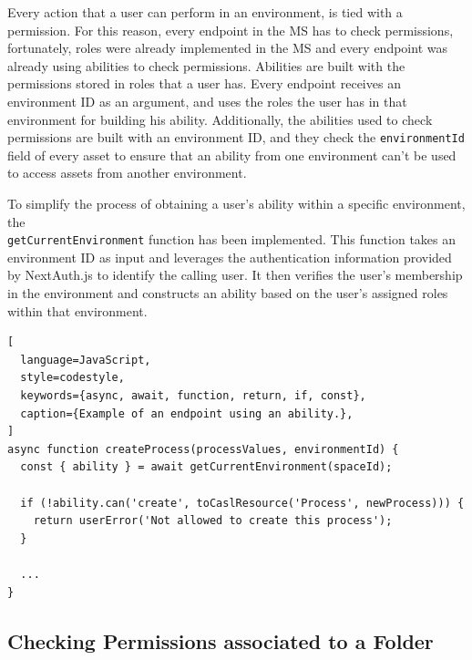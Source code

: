 Every action that a user can perform in an environment, is tied with a permission.
For this reason, every endpoint in the MS has to check permissions, fortunately, roles
were already implemented in the MS and every endpoint was already using abilities to check permissions.
Abilities are built with the permissions stored in roles that a user has.
Every endpoint receives an environment ID as an argument,
and uses the roles the user has in that environment for building his ability.
Additionally, the abilities used to check permissions are built with an environment ID,
and they check the \lstinline{environmentId} field of every asset to ensure that an
ability from one environment can't be used to access assets from another environment.

To simplify the process of obtaining a user's ability within a specific environment,
the \\ \lstinline{getCurrentEnvironment} function has been implemented.
This function takes an environment ID as input and leverages the authentication information provided by NextAuth.js 
to identify the calling user.
It then verifies the user's membership in the environment and constructs an ability based
on the user's assigned roles within that environment.

\begin{lstlisting}[
  language=JavaScript,
  style=codestyle,
  keywords={async, await, function, return, if, const},
  caption={Example of an endpoint using an ability.},
]
async function createProcess(processValues, environmentId) {
  const { ability } = await getCurrentEnvironment(spaceId);

  if (!ability.can('create', toCaslResource('Process', newProcess))) {
    return userError('Not allowed to create this process');
  }

  ...
}
\end{lstlisting}

\subsection{Checking Permissions associated to a Folder}

